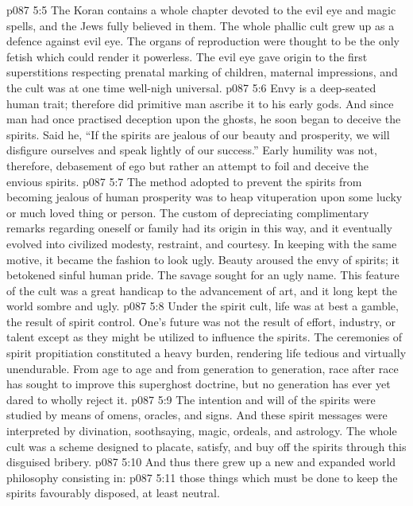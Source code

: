 \vs p087 5:5 The Koran contains a whole chapter devoted to the evil eye and magic spells, and the Jews fully believed in them. The whole phallic cult grew up as a defence against evil eye. The organs of reproduction were thought to be the only fetish which could render it powerless. The evil eye gave origin to the first superstitions respecting prenatal marking of children, maternal impressions, and the cult was at one time well\hyp{}nigh universal.
\vs p087 5:6 Envy is a deep\hyp{}seated human trait; therefore did primitive man ascribe it to his early gods. And since man had once practised deception upon the ghosts, he soon began to deceive the spirits. Said he, “If the spirits are jealous of our beauty and prosperity, we will disfigure ourselves and speak lightly of our success.” Early humility was not, therefore, debasement of ego but rather an attempt to foil and deceive the envious spirits.
\vs p087 5:7 The method adopted to prevent the spirits from becoming jealous of human prosperity was to heap vituperation upon some lucky or much loved thing or person. The custom of depreciating complimentary remarks regarding oneself or family had its origin in this way, and it eventually evolved into civilized modesty, restraint, and courtesy. In keeping with the same motive, it became the fashion to look ugly. Beauty aroused the envy of spirits; it betokened sinful human pride. The savage sought for an ugly name. This feature of the cult was a great handicap to the advancement of art, and it long kept the world sombre and ugly.
\vs p087 5:8 \pc Under the spirit cult, life was at best a gamble, the result of spirit control. One’s future was not the result of effort, industry, or talent except as they might be utilized to influence the spirits. The ceremonies of spirit propitiation constituted a heavy burden, rendering life tedious and virtually unendurable. From age to age and from generation to generation, race after race has sought to improve this superghost doctrine, but no generation has ever yet dared to wholly reject it.
\vs p087 5:9 The intention and will of the spirits were studied by means of omens, oracles, and signs. And these spirit messages were interpreted by divination, soothsaying, magic, ordeals, and astrology. The whole cult was a scheme designed to placate, satisfy, and buy off the spirits through this disguised bribery.
\vs p087 5:10 And thus there grew up a new and expanded world philosophy consisting in:
\vs p087 5:11 \bibnobreakspace {} those things which must be done to keep the spirits favourably disposed, at least neutral.
